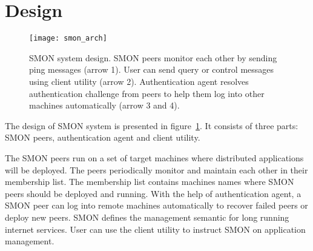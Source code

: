 \section{Design}
\label{sec:design}


\begin{figure}
\centering
\texttt{[image: smon\_arch]}
\caption{SMON system design.  SMON peers monitor each other
by sending ping messages (arrow 1).  User can send query or
control messages using client utility (arrow 2).
Authentication agent resolves authentication challenge from
peers to help them log into other machines automatically
(arrow 3 and 4).
}
\label{fig:smon_arch}
\end{figure}

The design of SMON system is presented in
figure~\ref{fig:smon_arch}.  It consists of three parts: SMON
peers, authentication agent and client utility.

The SMON peers run on a set of target machines where
distributed applications will be deployed. The peers
periodically monitor and maintain each other in their
membership list. The membership list contains machines
names where SMON peers should be deployed and running.
With the help of authentication agent, a SMON peer can log
into remote machines automatically to recover failed peers
or deploy new peers. SMON defines the management semantic
for long running internet services.  User can use the client
utility to instruct SMON on application management. 

